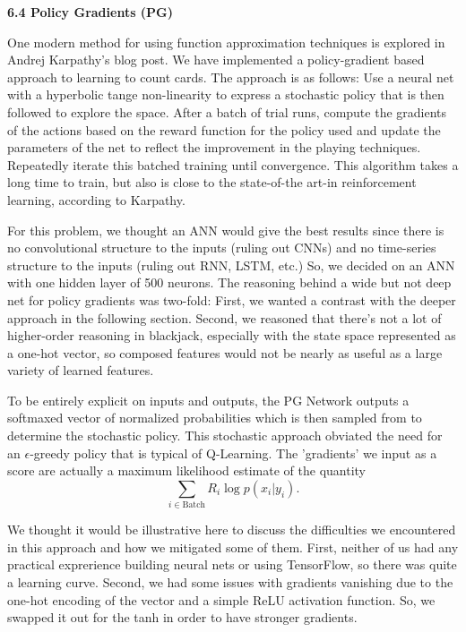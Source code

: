 \documentclass[12pt]{article}
\begin{document}
    \textbf{6.4 Policy Gradients (PG)} \newline

    One modern method for using function approximation techniques is explored in Andrej Karpathy's blog post. We have implemented a policy-gradient based approach to learning to count cards. The approach is as follows: Use a neural net with a hyperbolic tange non-linearity to express a stochastic policy that is then followed to explore the space. After a batch of trial runs, compute the gradients of the actions based on the reward function for the policy used and update the parameters of the net to reflect the improvement in the playing techniques. Repeatedly iterate this batched training until convergence. This algorithm takes a long time to train, but also is close to the state-of-the art-in reinforcement learning, according to Karpathy. \newline

    For this problem, we thought an ANN would give the best results since there is no convolutional structure to the inputs (ruling out CNNs) and no time-series structure to the inputs (ruling out RNN, LSTM, etc.) So, we decided on an ANN with one hidden layer of 500 neurons. The reasoning behind a wide but not deep net for policy gradients was two-fold: First, we wanted a contrast with the deeper approach in the following section. Second, we reasoned that there's not a lot of higher-order reasoning in blackjack, especially with the state space represented as a one-hot vector, so composed features would not be nearly as useful as a large variety of learned features.\newline

    To be entirely explicit on inputs and outputs, the PG Network outputs a softmaxed vector of normalized probabilities which is then sampled from to determine the stochastic policy. This stochastic approach obviated the need for an $\epsilon$-greedy policy that is typical of Q-Learning. The 'gradients' we input as a score are actually a maximum likelihood estimate of the quantity \[\sum_{i \in \text{Batch}}R_i\log p\left(x_i|y_i\right).\]

    We thought it would be illustrative here to discuss the difficulties we encountered in this approach and how we mitigated some of them. First, neither of us had any practical exprerience building neural nets or using TensorFlow, so there was quite a learning curve. Second, we had some issues with gradients vanishing due to the one-hot encoding of the vector and a simple ReLU activation function. So, we swapped it out for the tanh in order to have stronger gradients.\newline
\end{document}
